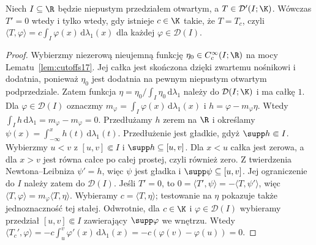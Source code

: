 \begin{twierdzenie}
\label{thm:zero-derivative20}
Niech $I\subseteq\R$ będzie niepustym przedziałem otwartym,
a $T\in\mathcal D'(I;\K)$. Wówczas $T'=0$
wtedy i tylko wtedy, gdy istnieje $c\in\K$ takie, że
$T=T_c$, czyli
$\langle T,\varphi\rangle=c\int_I\varphi(x)\,\mathrm d\lambda_1(x)$
dla każdej $\varphi\in\mathcal D(I)$.
\end{twierdzenie}
\begin{proof}
Wybierzmy niezerową nieujemną funkcję
$\eta_0\in C_c^\infty(I;\R)$ na mocy
Lematu~\ref{lem:cutoffs17}. Jej całka jest skończona
dzięki zwartemu nośnikowi i dodatnia, ponieważ $\eta_0$
jest dodatnia na pewnym niepustym otwartym podprzedziale.
Zatem
funkcja $\eta=\eta_0/\int_I\eta_0\,\mathrm d\lambda_1$
należy do $\mathcal D(I;\K)$ i ma całkę $1$.
Dla $\varphi\in\mathcal D(I)$ oznaczmy
$m_\varphi=\int_I\varphi(x)\,\mathrm d\lambda_1(x)$
i $h=\varphi-m_\varphi\eta$. Wtedy
$\int_I h\,\mathrm d\lambda_1=m_\varphi-m_\varphi=0$.
Przedłużamy $h$ zerem na $\R$ i określamy
$\psi(x)=\int_{-\infty}^xh(t)\,\mathrm d\lambda_1(t)$.
Przedłużenie jest gładkie, gdyż $\supp h\Subset I$.
Wybierzmy $u<v$ z $[u,v]\Subset I$ i
$\supp h\subseteq[u,v]$. Dla $x<u$ całka jest zerowa,
a dla $x>v$ jest równa całce po całej prostej, czyli również
zero. Z twierdzenia Newtona--Leibniza $\psi'=h$,
więc $\psi$ jest gładka i $\supp\psi\subseteq[u,v]$.
Jej ograniczenie do $I$ należy zatem do $\mathcal D(I)$. Jeśli $T'=0$, to
$0=\langle T',\psi\rangle=-\langle T,\psi'\rangle$,
więc $\langle T,\varphi\rangle=m_\varphi\langle T,\eta\rangle$.
Wybieramy $c=\langle T,\eta\rangle$; testowanie na $\eta$
pokazuje także jednoznaczność tej stałej.
Odwrotnie, dla $c\in\K$ i $\varphi\in\mathcal D(I)$
wybieramy przedział $[u,v]\Subset I$ zawierający
$\supp\varphi$ we wnętrzu. Wtedy
$\langle T_c',\varphi\rangle=-c\int_u^v\varphi'(x)\,
\mathrm d\lambda_1(x)=-c(\varphi(v)-\varphi(u))=0$.
\end{proof}

